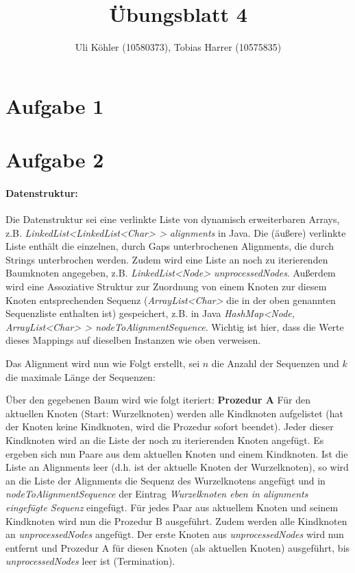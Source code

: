 \documentclass[a4paper,10pt,oneside,reqno]{scrartcl}
\title{Übungsblatt 4}
\author{Uli Köhler (10580373), Tobias Harrer (10575835)}
\begin{document}
\maketitle
\section*{Aufgabe 1}%

\section*{Aufgabe 2}%
\paragraph{Datenstruktur:}
Die Datenstruktur sei eine verlinkte Liste von dynamisch erweiterbaren Arrays, z.B. \textit{LinkedList<LinkedList<Char> > alignments} in Java.
Die (äußere) verlinkte Liste enthält die einzelnen, durch Gaps unterbrochenen Alignments, die durch Strings unterbrochen werden. Zudem wird eine Liste an noch zu iterierenden Baumknoten angegeben, z.B. \textit{LinkedList<Node> unprocessedNodes}. Außerdem wird eine Assoziative Struktur zur Zuordnung von einem Knoten zur diesem Knoten entsprechenden Sequenz (\textit{ArrayList<Char>} die in der oben genannten Sequenzliste enthalten ist) gespeichert, z.B. in Java \textit{HashMap<Node, ArrayList<Char> > nodeToAlignmentSequence}. Wichtig ist hier, dass die Werte dieses Mappings auf dieselben Instanzen wie oben verweisen.

Das Alignment wird nun wie Folgt erstellt, sei $n$ die Anzahl der Sequenzen und $k$ die maximale Länge der Sequenzen: 

Über den gegebenen Baum wird wie folgt iteriert:
\textbf{Prozedur A} Für den aktuellen Knoten (Start: Wurzelknoten) werden alle Kindknoten aufgelistet (hat der Knoten keine Kindknoten, wird die Prozedur sofort beendet). Jeder dieser Kindknoten wird an die Liste der noch zu iterierenden Knoten angefügt. Es ergeben sich nun Paare aus dem aktuellen Knoten und einem Kindknoten. Ist die Liste an Alignments leer (d.h. ist der aktuelle Knoten der Wurzelknoten), so wird an die Liste der Alignments die Sequenz des Wurzelknotens angefügt und in \textit{nodeToAlignmentSequence} der Eintrag \textit{Wurzelknoten \textrightarrow eben in alignments eingefügte Sequenz} eingefügt. Für jedes Paar aus aktuellem Knoten und seinem Kindknoten wird nun die Prozedur B ausgeführt. Zudem werden alle Kindknoten an \textit{unprocessedNodes} angefügt. Der erste Knoten aus \textit{unprocessedNodes} wird nun entfernt und Prozedur A für diesen Knoten (als aktuellen Knoten) ausgeführt, bis \textit{unprocessedNodes} leer ist (\textrightarrow Termination).\\[5mm]
\end{document}

